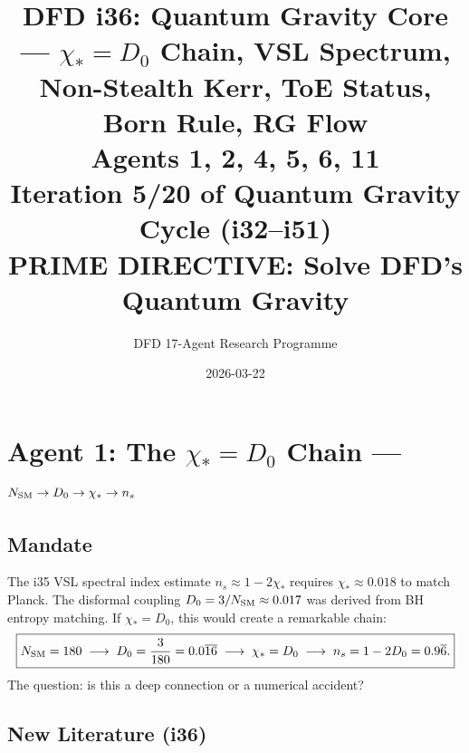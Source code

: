 \documentclass[11pt,a4paper]{article}
\title{DFD i36: Quantum Gravity Core --- $\chi_*{=}D_0$ Chain, VSL Spectrum,\\Non-Stealth Kerr, ToE Status, Born Rule, RG Flow\\[6pt]
\large Agents 1, 2, 4, 5, 6, 11\\[6pt]
\normalsize Iteration 5/20 of Quantum Gravity Cycle (i32--i51)\\
PRIME DIRECTIVE: Solve DFD's Quantum Gravity}
\author{DFD 17-Agent Research Programme}
\date{2026-03-22}
\begin{document}
\maketitle
\tableofcontents
\newpage

\section{Agent 1: The $\chi_* = D_0$ Chain --- $N_{\rm SM} \to D_0 \to \chi_* \to n_s$}
\label{sec:agent1}

\subsection{Mandate}

The i35 VSL spectral index estimate $n_s \approx 1 - 2\chi_*$ requires $\chi_* \approx 0.018$ to match Planck. The disformal coupling $D_0 = 3/N_{\rm SM} \approx 0.017$ was derived from BH entropy matching. If $\chi_* = D_0$, this would create a remarkable chain:
\begin{equation}
\boxed{N_{\rm SM} = 180 \;\longrightarrow\; D_0 = \frac{3}{180} = 0.0\overline{16} \;\longrightarrow\; \chi_* = D_0 \;\longrightarrow\; n_s = 1 - 2D_0 = 0.9\overline{6}.}
\end{equation}
The question: is this a deep connection or a numerical accident?

\subsection{New Literature (i36)}
\end{document}
